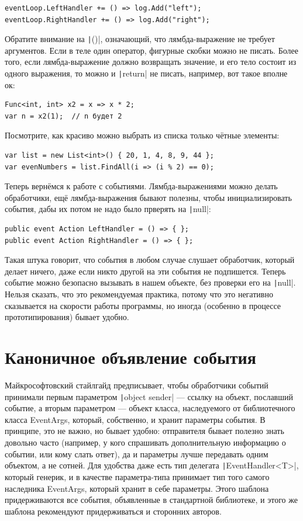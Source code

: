 \documentclass[a5paper]{article}
\begin{document}
\begin{verbatim}
eventLoop.LeftHandler += () => log.Add("left");
eventLoop.RightHandler += () => log.Add("right");
\end{verbatim}

Обратите внимание на \texttt|()|, означающий, что лямбда-выражение не требует аргументов. Если в теле один оператор, фигурные скобки можно не писать. Более того, если лямбда-выражение должно возвращать значение, и его тело состоит из одного выражения, то можно и \texttt|return| не писать, например, вот такое вполне ок:

\begin{verbatim}
Func<int, int> x2 = x => x * 2;
var n = x2(1);  // n будет 2
\end{verbatim}

Посмотрите, как красиво можно выбрать из списка только чётные элементы:

\begin{verbatim}
var list = new List<int>() { 20, 1, 4, 8, 9, 44 };
var evenNumbers = list.FindAll(i => (i % 2) == 0);
\end{verbatim}

Теперь вернёмся к работе с событиями. Лямбда-выражениями можно делать обработчики, ещё лямбда-выражения бывают полезны, чтобы инициализировать события, дабы их потом не надо было прверять на \texttt|null|:

\begin{verbatim}
public event Action LeftHandler = () => { };
public event Action RightHandler = () => { };
\end{verbatim}

Такая штука говорит, что события в любом случае слушает обработчик, который делает ничего, даже если никто другой на эти события не подпишется. Теперь событие можно безопасно вызывать в нашем объекте, без проверки его на \texttt|null|. Нельзя сказать, что это рекомендуемая практика, потому что это негативно сказывается на скорости работы программы, но иногда (особенно в процессе прототипирования) бывает удобно.

\section{Каноничное объявление события}

Майкрософтовский стайлгайд предписывает, чтобы обработчики событий принимали первым параметром \texttt|object sender| --- ссылку на объект, пославший событие, а вторым параметром --- объект класса, наследуемого от библиотечного класса EventArgs, который, собственно, и хранит параметры события. В принципе, это не важно, но бывает удобно: отправителя бывает полезно знать довольно часто (например, у кого спрашивать дополнительную информацию о событии, или кому слать ответ), да и параметры лучше передавать одним объектом, а не сотней. Для удобства даже есть тип делегата \texttt|EventHandler<T>|, который генерик, и в качестве параметра-типа принимает тип того самого наследника EventArgs, который хранит в себе параметры. Этого шаблона придерживаются все события, объявленные в стандартной библиотеке, и этого же шаблона рекомендуют придерживаться и сторонних авторов.
\end{document}
